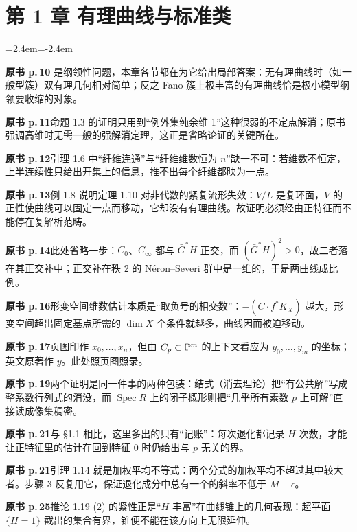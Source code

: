 \section*{第 1 章 有理曲线与标准类}
\begin{list}{}{\leftmargin=2.4em\itemindent=-2.4em\itemsep=2pt\parsep=0pt}
\item \textbf{原书 p.\,10} 是纲领性问题，本章各节都在为它给出局部答案：无有理曲线时（如一般型簇）双有理几何相对简单；反之 Fano 簇上极丰富的有理曲线恰是极小模型纲领要收缩的对象。
\item \textbf{原书 p.\,11}\quad 命题 1.3 的证明只用到“例外集纯余维 1”这种很弱的不定点解消；原书强调高维时无需一般的强解消定理，这正是省略论证的关键所在。
\item \textbf{原书 p.\,12}\quad 引理 1.6 中“纤维连通”与“纤维维数恒为 $n$”缺一不可：若维数不恒定，上半连续性只给出开集上的信息，推不出每个纤维都映为一点。
\item \textbf{原书 p.\,13}\quad 例 1.8 说明定理 1.10 对非代数的紧复流形失效：$V/L$ 是复环面，$V$ 的正性使曲线可以固定一点而移动，它却没有有理曲线。故证明必须经由正特征而不能停在复解析范畴。
\item \textbf{原书 p.\,14}\quad 此处省略一步：$C_0$、$C_\infty$ 都与 $\bar G^*H$ 正交，而 $(\bar G^*H)^2>0$，故二者落在其正交补中；正交补在秩 2 的 Néron–Severi 群中是一维的，于是两曲线成比例。
\item \textbf{原书 p.\,16}\quad 形变空间维数估计本质是“取负号的相交数”：$-(C\cdot f^*K_X)$ 越大，形变空间超出固定基点所需的 $\dim X$ 个条件就越多，曲线因而被迫移动。
\item \textbf{原书 p.\,17}\quad 页图印作 $x_0,\dots,x_n$，但由 $C_p\subset\mathbb{P}^m$ 的上下文看应为 $y_0,\dots,y_m$ 的坐标；英文原著作 $y$。此处照页图照录。
\item \textbf{原书 p.\,19}\quad 两个证明是同一件事的两种包装：结式（消去理论）把“有公共解”写成整系数行列式的消没，而 $\operatorname{Spec}R$ 上的闭子概形则把“几乎所有素数 $p$ 上可解”直接读成像集稠密。
\item \textbf{原书 p.\,21}\quad 与 §1.1 相比，这里多出的只有“记账”：每次退化都记录 $H$-次数，才能让正特征里的估计在回到特征 0 时仍给出与 $p$ 无关的界。
\item \textbf{原书 p.\,21}\quad 引理 1.14 就是加权平均不等式：两个分式的加权平均不超过其中较大者。步骤 3 反复用它，保证退化成分中总有一个的斜率不低于 $M-\epsilon$。
\item \textbf{原书 p.\,25}\quad 推论 1.19 (2) 的紧性正是“$H$ 丰富”在曲线锥上的几何表现：超平面 $\{H=1\}$ 截出的集合有界，锥便不能在该方向上无限延伸。

\end{list}
